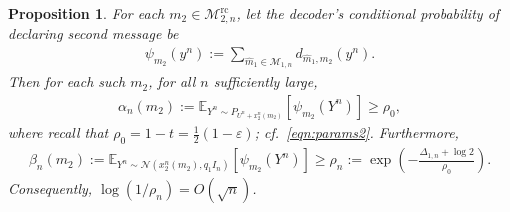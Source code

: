 \documentclass[11pt,onecolumn]{IEEEtran}
\newcommand{\calM}{\mathcal{M}}
\newcommand{\calN}{\mathcal{N}}
\newcommand{\bbE}{\mathbb{E}}
\newcommand{\hatm}{\hat{m}}
\newcommand{\eps}{\varepsilon}
\newtheorem{proposition}[theorem]{Proposition}
\newcommand{\rc}{\mathrm{rc}}
\begin{document}
\begin{proposition} \label{prop:user2}
For each $m_2\in\calM_{2,n}^\rc$, let the decoder's conditional probability of declaring second message be
\begin{align}
\psi_{m_2}(y^n)
:=\sum_{\hatm_1\in\calM_{1,n}}
     d_{\hatm_1,m_2}(y^n).
\end{align}
Then for each such $m_2$,  for all $n$ sufficiently large,
\begin{align}
\alpha_n(m_2):=\bbE_{Y^n \sim P_{U^n+x_2^n(m_2)}}[ \psi_{m_2}(Y^n) ] \ge\rho_0, \label{eqn:def_alpha_n}
\end{align}
where recall that $\rho_0=1-t=\frac{1}{2}(1-\eps)$; cf.~\eqref{eqn:params2}. Furthermore,
\begin{align}
\beta_n(m_2):=\bbE_{Y^n \sim \calN(x_2^n(m_2), q_1I_n) }[ \psi_{m_2}(Y^n) ] \ge\rho_n:=\exp\left(-\frac{\Delta_{1,n}+\log 2}{\rho_0} \right). \label{eqn:def_beta_n}
\end{align}
Consequently, $\log(1/\rho_n)=O(\sqrt{n})$.
\end{proposition}
\end{document}
